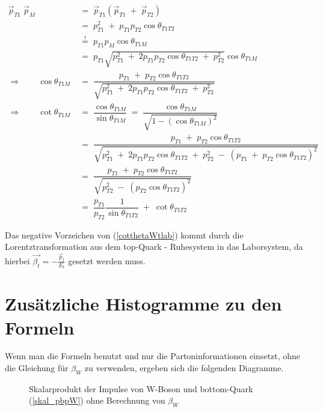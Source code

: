 \documentclass[
a4paper,                                %
twoside,                                %
BCOR1.4cm,                      %
ngerman,                                %
10pt,                           %
headings=normal,                %
headsepline,                    %
clearplainpage, %
final,                                  %
div=14,
parskip=full
]{scrbook}
\begin{document}
\begin{align*}
	\vec{p}_{T1}\;\vec{p}_{M}
\;&=\;
	\vec{p}_{T1} \left(\vec{p}_{T1}\;+\;\vec{p}_{T2}\right)
\\
\;&=\;
	p_{T1}^{2}\;+\;p_{T1} p_{T2} \cos \theta_{T1 T2}
\\
\;&\stackrel{\mathrm{!}}=\;
	p_{T1} p_{M} \cos \theta_{T1 M}
\\
\;&=\;
	p_{T1} 
	\sqrt{p_{T1}^{2}
	\;+\;2 p_{T1} p_{T2} \cos \theta_{T1 T2}\;+\;p_{T2}^{2}} 
	\cos \theta_{T1 M}
\\
\Rightarrow \qquad \cos \theta_{T1 M}
\;&=\;
	\dfrac{p_{T1}\;+\;p_{T2} \cos \theta_{T1 T2}}{\sqrt{p_{T1}^{2}
	\;+\;2 p_{T1} p_{T2} \cos \theta_{T1 T2}\;+\;p_{T2}^{2}}}
\\
\Rightarrow \qquad \cot \theta_{T1 M}
\;&=\;
	\dfrac{\cos \theta_{T1 M}}{\sin \theta_{T1 M}}
\;=\;
	\dfrac{\cos \theta_{T1 M}}
	{\sqrt{1 - \left(\cos \theta_{T1 M}\right)^{2}}}
\\
\;&=\;
	\dfrac{p_{T1}\;+\;p_{T2} \cos \theta_{T1 T2}}
	{\sqrt{p_{T1}^{2}\;+\;2 p_{T1} p_{T2} \cos \theta_{T1 T2}
	\;+\;p_{T2}^{2}
	\;-\;\left(p_{T1}\;+\;p_{T2} \cos \theta_{T1 T2}\right)^{2}}}
\\
\;&=\;
	\dfrac{p_{T1}\;+\;p_{T2} \cos \theta_{T1 T2}}
	{\sqrt{p_{T2}^{2}
	\;-\;\left(p_{T2} \cos \theta_{T1 T2}\right)^{2}}}
\\
\;&=\;
	\dfrac{p_{T1}}{p_{T2}} \dfrac{1}{\sin \theta_{T1 T2}}
	\;+\;\cot \theta_{T1 T2}
\end{align*}

Das negative Vorzeichen von (\ref{cotthetaWtlab}) kommt durch die Lorentztransformation aus dem top-Quark - Ruhesystem in das Laborsystem, da hierbei 
$ \vec{\beta_{t}} = -\tfrac{\vec{p}_{t}}{E_{t}} $
gesetzt werden muss.

\newpage

\section{Zus\"atzliche Histogramme zu den Formeln}\label{histogrammeanhang}

Wenn man die Formeln benutzt und nur die Partoninformationen einsetzt, ohne die Gleichung f\"ur $ \beta_{W} $ zu verwenden, ergeben sich die folgenden Diagramme.

\begin{figure}[h]
    \caption{Skalarprodukt der Impulse von W-Boson und bottom-Quark (\ref{skal_pbpW}) ohne Berechnung von $ \beta_{W} $}
\end{figure}
\end{document}

